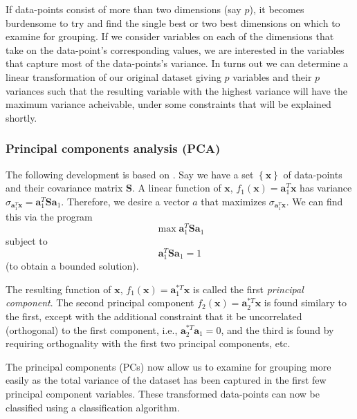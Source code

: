 \documentclass[letterpaper,12pt]{report}
\begin{document}
If data-points consist of more than two dimensions (say $p$), it becomes
burdensome to try and find the single best or two best dimensions on which to
examine for grouping. If we consider variables on each of the dimensions that
take on the data-point's corresponding values, we are interested in the
variables that capture most of the data-points's variance. In turns out we can
determine a linear transformation of our original dataset giving $p$ variables
and their $p$ variances such that the resulting variable with the highest
variance will have the maximum variance acheivable, under some constraints that
will be explained shortly. 

\subsubsection{Principal components analysis (PCA)}

The following development is based on \cite{jolliffe2002principal}. Say we have
a set $\left\{ \boldsymbol{x} \right\}$ of data-points and their covariance
matrix $\boldsymbol{S}$. A linear function of $\boldsymbol{x}$,
$f_1(\boldsymbol{x})=\boldsymbol{a}_{1}^{T}\boldsymbol{x}$ has variance
$\sigma_{\boldsymbol{a}_{1}^{T}\boldsymbol{x}}=\boldsymbol{a}_{1}^{T}\boldsymbol{S}\boldsymbol{a}_{1}$.
Therefore, we desire a vector $a$ that maximizes
$\sigma_{\boldsymbol{a}_{1}^{T}\boldsymbol{x}}$. We can find this via the program
\[
        \max \boldsymbol{a}_{1}^{T}\boldsymbol{S}\boldsymbol{a}_{1}
\]
subject to
\[
    \boldsymbol{a}_{1}^{T}\boldsymbol{S}\boldsymbol{a}_{1}=1
\]
(to obtain a bounded solution).

The resulting function of $\boldsymbol{x}$,
$f_1(\boldsymbol{x})=\boldsymbol{a}_{1}^{\ast T}\boldsymbol{x}$ is called the first
\textit{principal component}. The second principal component
$f_2(\boldsymbol{x})=\boldsymbol{a}_{2}^{\ast T}\boldsymbol{x}$ is found similary
to the first, except with the additional constraint that it be uncorrelated
(orthogonal) to the first component, i.e.,
$\boldsymbol{a}_{2}^{\ast T}\boldsymbol{a}_{1}=0$, and the third is found by
requiring orthognality with the first two principal components, etc.

The principal components (PCs) now allow us to examine for grouping more easily as the
total variance of the dataset has been captured in the first few principal component
variables. These transformed data-points can now be classified using a
classification algorithm.
\end{document}
